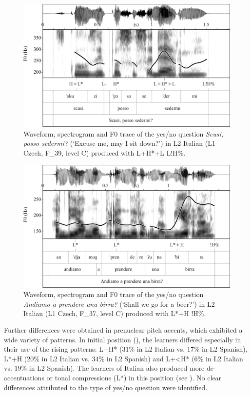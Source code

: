 \begin{figure}[p]
\includegraphics[width=\textwidth]{figures/Figure_4.85.png}
\caption{Waveform, spectrogram and F0 trace of the yes/no question \textit{Scusi, posso sedermi?} (‘Excuse me, may I sit down?’) in L2 Italian (L1 Czech, F\_39, level C) produced with L+H*+L L!H\%.}
\label{fig:4.85}
\end{figure}

\begin{figure}[p]
\includegraphics[width=\textwidth]{figures/Figure_4.86.png}

\caption{Waveform, spectrogram and F0 trace of the yes/no question \textit{Andiamo a prendere una birra?} (‘Shall we go for a beer?’) in L2 Italian (L1 Czech, F\_37, level C) produced with L*+H !H\%.}
\label{fig:4.86}
\end{figure}

Further differences were obtained in prenuclear pitch accents, which exhibited a wide variety of patterns. In initial position (), the learners differed especially in their use of the rising patterns: L+H* (31\% in L2 Italian vs. 17\% in L2 Spanish), L*+H (20\% in L2 Italian vs. 34\% in L2 Spanish) and L+<H* (6\% in L2 Italian vs. 19\% in L2 Spanish). The learners of Italian also produced more de-accentuations or tonal compressions (L*) in this position (see ). No clear differences attributed to the type of yes/no question were identified.

